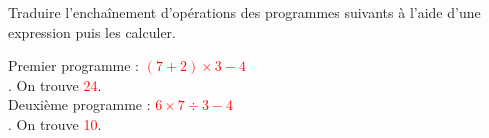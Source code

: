 \begin{exercice}%
    Traduire l'enchaînement d'opérations des programmes suivants à l'aide d'une expression puis les calculer.
    \setlength{\columnseprule}{0pt}
    \begin{multicols}{2}
    \end{multicols}
 \end{exercice}
 
 \begin{corrige}
    Premier programme : \textcolor{red}{$(7 + 2)\times3-4$} \\ [1mm]
    . On trouve \textcolor{red}{24}. \\
    Deuxième programme :  \textcolor{red}{$6\times7\div3-4$} \\ [1mm]
    . On trouve \textcolor{red}{10}.
 \end{corrige}